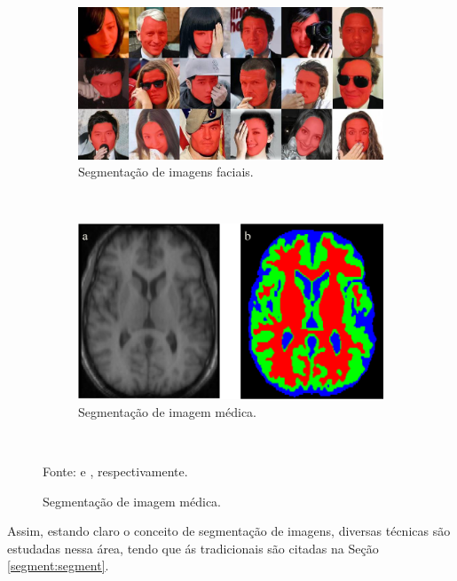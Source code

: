 \begin{figure}[H]
   \caption{Exemplos de segmentações de imagens.}
   \centering
   \label{segment:fig:1}
    \begin{subfigure}[t]{0.5\textwidth}
        \centering
        \includegraphics[width=1\linewidth]{recursos/imagens/image_seg/faces.png}
        \caption{Segmentação de imagens faciais.}
        \label{segment:fig:1.1}
    \end{subfigure}%
    ~ 

    \begin{subfigure}[t]{0.5\textwidth}
        \centering
        \includegraphics[width=1\linewidth]{recursos/imagens/image_seg/cerebro.png}
        \caption{Segmentação de imagem médica.}
        \label{segment:fig:1.2}
    \end{subfigure}%
    ~

    \vspace*{1 cm}
    Fonte: \cite{Nirkin2018} e \cite{Withey2008}, respectivamente.
\end{figure}

Assim, estando claro o conceito de segmentação de imagens, diversas técnicas são estudadas nessa área, tendo que ás tradicionais são citadas na Seção \ref{segment:segment}.


